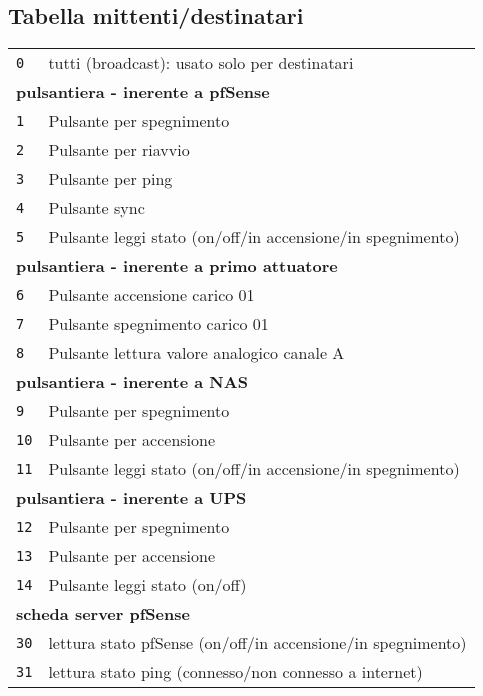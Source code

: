 \documentclass{article}
\begin{document}
    \subsection{Tabella mittenti/destinatari}
    
    

        \begin{tabular}{ll}
            \texttt{0} & tutti (broadcast): usato solo per destinatari\\
            \multicolumn{2}{l}{\textbf{pulsantiera - inerente a pfSense}}\\
            \texttt{1} & Pulsante per spegnimento\\
            \texttt{2} & Pulsante per riavvio\\
            \texttt{3} & Pulsante per ping \\
            \texttt{4} & Pulsante sync \\
            \texttt{5} & Pulsante leggi stato (on/off/in accensione/in spegnimento)\\
            \multicolumn{2}{l}{\textbf{pulsantiera - inerente a primo attuatore}}\\
            \texttt{6} & Pulsante accensione carico 01\\
            \texttt{7} & Pulsante spegnimento carico 01\\
            \texttt{8} & Pulsante lettura valore analogico canale A\\
			\multicolumn{2}{l}{\textbf{pulsantiera - inerente a NAS}}\\
			\texttt{9} & Pulsante per spegnimento\\
			\texttt{10} & Pulsante per accensione\\
			\texttt{11} & Pulsante leggi stato (on/off/in accensione/in spegnimento)\\
			\multicolumn{2}{l}{\textbf{pulsantiera - inerente a UPS}}\\
			\texttt{12} & Pulsante per spegnimento\\
			\texttt{13} & Pulsante per accensione\\
			\texttt{14} & Pulsante leggi stato (on/off)\\			
            \multicolumn{2}{l}{\textbf{scheda server pfSense}}\\
            \texttt{30} & lettura stato pfSense (on/off/in accensione/in spegnimento)\\        
            \texttt{31} & lettura stato ping (connesso/non connesso a internet)\\            

\end{tabular}
\end{document}
